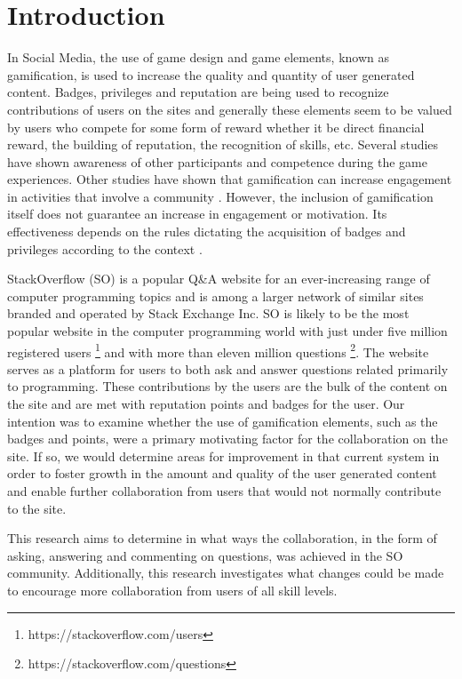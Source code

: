 \documentclass{sigchi}
\begin{document}


\section{Introduction}
In Social Media, the use of game design and game elements, known as gamification, is used to increase the quality and quantity of user generated content. Badges, privileges and reputation are being used to recognize contributions of users on the sites and generally these elements seem to be valued by users who compete for some form of reward whether it be direct financial reward, the building of reputation, the recognition of skills, etc. Several studies have shown awareness of other participants and competence during the game experiences\cite{Rughinis}. Other studies have shown that gamification can increase engagement in activities that involve a community \cite{Marder}. However, the inclusion of gamification itself does not guarantee an increase in engagement or motivation. Its effectiveness depends on the rules dictating the acquisition of badges and privileges according to the context \cite{Deterding}.

StackOverflow (SO) is a popular Q\&A website for an ever-increasing range of computer programming topics and is among a larger network of similar sites branded and operated by Stack Exchange Inc. SO is likely to be the most popular website in the computer programming world with just under five million registered users \footnote{https://stackoverflow.com/users} and with more than eleven million questions \footnote{https://stackoverflow.com/questions}. The website serves as a platform for users to both ask and answer questions related primarily to programming. These contributions by the users are the bulk of the content on the site and are met with reputation points and badges for the user. Our intention was to examine whether the use of gamification elements, such as the badges and points, were a primary motivating factor for the collaboration on the site. If so, we would determine areas for improvement in that current system in order to foster growth in the amount and quality of the user generated content and enable further collaboration from users that would not normally contribute to the site.

This research aims to determine in what ways the collaboration, in the form of asking, answering and commenting on questions, was achieved in the SO community.
Additionally, this research investigates what changes could be made to encourage more collaboration from users of all skill levels.
\end{document}
